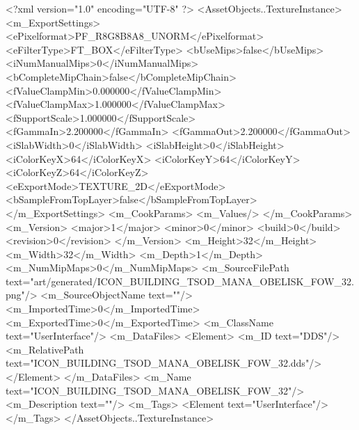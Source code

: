 <?xml version="1.0" encoding="UTF-8" ?>
<AssetObjects..TextureInstance>
	<m_ExportSettings>
		<ePixelformat>PF_R8G8B8A8_UNORM</ePixelformat>
		<eFilterType>FT_BOX</eFilterType>
		<bUseMips>false</bUseMips>
		<iNumManualMips>0</iNumManualMips>
		<bCompleteMipChain>false</bCompleteMipChain>
		<fValueClampMin>0.000000</fValueClampMin>
		<fValueClampMax>1.000000</fValueClampMax>
		<fSupportScale>1.000000</fSupportScale>
		<fGammaIn>2.200000</fGammaIn>
		<fGammaOut>2.200000</fGammaOut>
		<iSlabWidth>0</iSlabWidth>
		<iSlabHeight>0</iSlabHeight>
		<iColorKeyX>64</iColorKeyX>
		<iColorKeyY>64</iColorKeyY>
		<iColorKeyZ>64</iColorKeyZ>
		<eExportMode>TEXTURE_2D</eExportMode>
		<bSampleFromTopLayer>false</bSampleFromTopLayer>
	</m_ExportSettings>
	<m_CookParams>
		<m_Values/>
	</m_CookParams>
	<m_Version>
		<major>1</major>
		<minor>0</minor>
		<build>0</build>
		<revision>0</revision>
	</m_Version>
	<m_Height>32</m_Height>
	<m_Width>32</m_Width>
	<m_Depth>1</m_Depth>
	<m_NumMipMaps>0</m_NumMipMaps>
	<m_SourceFilePath text="art/generated/ICON_BUILDING_TSOD_MANA_OBELISK_FOW_32.png"/>
	<m_SourceObjectName text=""/>
	<m_ImportedTime>0</m_ImportedTime>
	<m_ExportedTime>0</m_ExportedTime>
	<m_ClassName text="UserInterface"/>
	<m_DataFiles>
		<Element>
			<m_ID text="DDS"/>
			<m_RelativePath text="ICON_BUILDING_TSOD_MANA_OBELISK_FOW_32.dds"/>
		</Element>
	</m_DataFiles>
	<m_Name text="ICON_BUILDING_TSOD_MANA_OBELISK_FOW_32"/>
	<m_Description text=""/>
	<m_Tags>
		<Element text="UserInterface"/>
	</m_Tags>
</AssetObjects..TextureInstance>
